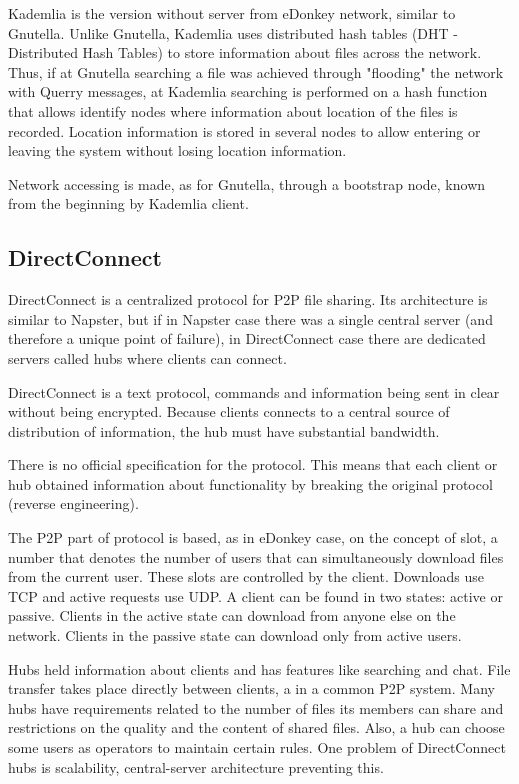 Kademlia is the version without server from eDonkey network, similar to Gnutella.
Unlike Gnutella, Kademlia uses distributed hash tables (DHT - Distributed Hash
Tables) to store information about files across the network. Thus, if at Gnutella
searching a file was achieved through "flooding" the network with Querry messages,
at Kademlia searching is performed on a hash function that allows identify nodes
where information about location of the files is recorded. Location information
is stored in several nodes to allow entering or leaving the system without losing
location information.

Network accessing is made, as for Gnutella, through a bootstrap node, known from
the beginning by Kademlia client.

\subsection{DirectConnect}

DirectConnect is a centralized protocol for P2P file sharing. Its architecture
is similar to Napster, but if in Napster case there was a single central server
(and therefore a unique point of failure), in DirectConnect case there are
dedicated servers called hubs where clients can connect.

DirectConnect is a text protocol, commands and information being sent in clear
without being encrypted. Because clients connects to a central source of
distribution of information, the hub must have substantial bandwidth.

There is no official specification for the protocol. This means that each client
or hub obtained information about functionality by breaking the original
protocol (reverse engineering).

The P2P part of protocol  is based, as in eDonkey case, on the concept of slot,
a number that denotes the number of users that can simultaneously download files
from the current user. These slots are controlled by the client. Downloads use
TCP and active requests use UDP. A client can be found in two states: active or
passive. Clients in the active state can download from anyone else on the
network. Clients in the passive state can download only from active users.

Hubs held information about clients and has features like searching and chat.
File transfer takes place directly between clients, a in a common P2P system.
Many hubs have requirements related to the number of files its members can share
and restrictions on the quality and the content of shared files. Also, a hub
can choose some users as operators to maintain certain rules. One problem of
DirectConnect hubs is scalability, central-server architecture preventing this.

